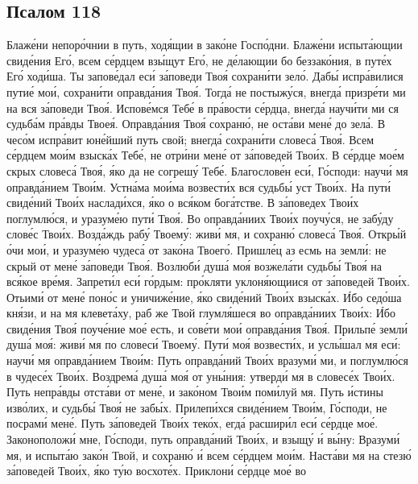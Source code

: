 \begin{mymulticols}
\priiditepoklonimsia

\section{Псалом 118}

Блаж\'{е}ни непор\'{о}чнии в путь, ход\'{я}щии в зак\'{о}не Госп\'{о}дни. Блаж\'{е}ни испыт\'{а}ющии свид\'{е}ния Ег\'{о}, всем с\'{е}рдцем вз\'{ы}щут Ег\'{о}, не д\'{е}лающии бо беззак\'{о}ния, в пут\'{е}х Ег\'{о} ход\'{и}ша. Ты запов\'{е}дал ес\'{и} з\'{а}поведи Тво\'{я} сохран\'{и}ти зел\'{о}. Даб\'{ы} испр\'{а}вилися пути\'{е} мо\'{и}, сохран\'{и}ти оправд\'{а}ния Тво\'{я}. Тогд\'{а} не постыж\'{у}ся, внегд\'{а} призр\'{е}ти ми на вся з\'{а}поведи Тво\'{я}. Испов\'{е}мся Теб\'{е} в пр\'{а}вости с\'{е}рдца, внегд\'{а} науч\'{и}ти ми ся судьб\'{а}м пр\'{а}вды Твое\'{я}. Оправд\'{а}ния Тво\'{я} сохран\'{ю}, не ост\'{а}ви мен\'{е} до зел\'{а}. В чес\'{о}м испр\'{а}вит юн\'{е}йший путь свой; внегд\'{а} сохран\'{и}ти словес\'{а} Тво\'{я}. Всем с\'{е}рдцем мо\'{и}м взыск\'{а}х Теб\'{е}, не отр\'{и}ни мен\'{е} от з\'{а}поведей Тво\'{и}х. В с\'{е}рдце мо\'{е}м скрых словес\'{а} Тво\'{я}, \'{я}ко да не согреш\'{у} Теб\'{е}. Благослов\'{е}н ес\'{и}, Г\'{о}споди: науч\'{и} мя оправд\'{а}нием Тво\'{и}м. Устн\'{а}ма мо\'{и}ма возвест\'{и}х вся судьб\'{ы} уст Тво\'{и}х. На пут\'{и} свид\'{е}ний Тво\'{и}х наслад\'{и}хся, \'{я}ко о вс\'{я}ком бог\'{а}тстве. В з\'{а}поведех Тво\'{и}х поглумл\'{ю}ся, и уразум\'{е}ю пут\'{и} Тво\'{я}. Во оправд\'{а}ниих Тво\'{и}х поуч\'{у}ся, не заб\'{у}ду слов\'{е}с Тво\'{и}х. Возд\'{а}ждь раб\'{у} Твоем\'{у}: жив\'{и} мя, и сохран\'{ю} словес\'{а} Тво\'{я}. Откр\'{ы}й \'{о}чи мо\'{и}, и уразум\'{е}ю чудес\'{а} от зак\'{о}на Твоег\'{о}. Пришл\'{е}ц аз есмь на земл\'{и}: не скрый от мен\'{е} з\'{а}поведи Тво\'{я}. Возлюб\'{и} душ\'{а} мо\'{я} возжел\'{а}ти судьб\'{ы} Тво\'{я} на вс\'{я}кое вр\'{е}мя. Запрет\'{и}л ес\'{и} г\'{о}рдым: пр\'{о}кляти уклон\'{я}ющиися от з\'{а}поведей Тво\'{и}х. Отьим\'{и} от мен\'{е} пон\'{о}с и уничиж\'{е}ние, \'{я}ко свид\'{е}ний Тво\'{и}х взыск\'{а}х. \'{И}бо сед\'{о}ша кн\'{я}зи, и на мя клевет\'{а}ху, раб же Твой глумл\'{я}шеся во оправд\'{а}ниих Тво\'{и}х: \'{И}бо свид\'{е}ния Тво\'{я} поуч\'{е}ние мо\'{е} есть, и сов\'{е}ти мо\'{и} оправд\'{а}ния Тво\'{я}. Прильп\'{е} земл\'{и} душ\'{а} мо\'{я}: жив\'{и} мя по словес\'{и} Твоем\'{у}. Пут\'{и} мо\'{я} возвест\'{и}х, и усл\'{ы}шал мя ес\'{и}: науч\'{и} мя оправд\'{а}нием Тво\'{и}м: Путь оправд\'{а}ний Тво\'{и}х вразум\'{и} ми, и поглумл\'{ю}ся в чудес\'{е}х Тво\'{и}х. Воздрем\'{а} душ\'{а} мо\'{я} от ун\'{ы}ния: утверд\'{и} мя в словес\'{е}х Тво\'{и}х. Путь непр\'{а}вды отст\'{а}ви от мен\'{е}, и зак\'{о}ном Тво\'{и}м пом\'{и}луй мя. Путь \'{и}стины изв\'{о}лих, и судьб\'{ы} Тво\'{я} не заб\'{ы}х. Прилеп\'{и}хся свид\'{е}нием Тво\'{и}м, Г\'{о}споди, не посрам\'{и} мен\'{е}. Путь з\'{а}поведей Тво\'{и}х тек\'{о}х, егд\'{а} расшир\'{и}л ес\'{и} с\'{е}рдце мо\'{е}. Законополож\'{и} мне, Г\'{о}споди, путь оправд\'{а}ний Тво\'{и}х, и взыщ\'{у} \'{и} в\'{ы}ну: Вразум\'{и} мя, и испыт\'{а}ю зак\'{о}н Твой, и сохран\'{ю} \'{и} всем с\'{е}рдцем мо\'{и}м. Наст\'{а}ви мя на стез\'{ю} з\'{а}поведей Тво\'{и}х, \'{я}ко т\'{у}ю восхот\'{е}х. Приклон\'{и} с\'{е}рдце мо\'{е} во 
\end{mymulticols}
